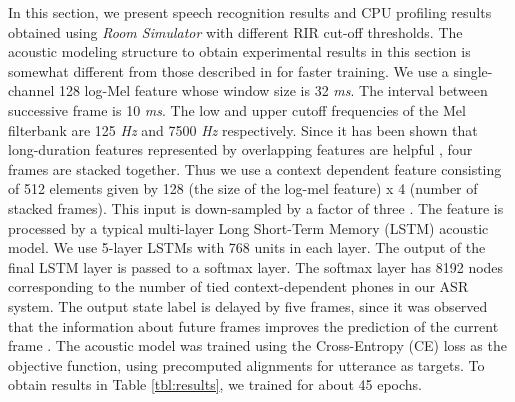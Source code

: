 \documentclass[a4paper]{article}
\begin{document}
In this section, we present speech recognition results and CPU profiling
results obtained using \textit{Room Simulator} with different RIR cut-off
thresholds. The acoustic modeling structure to obtain
 experimental results in this section is somewhat different
from those described in \cite{C_Kim_INTERSPEECH_2017_1, B_Li_INTERSPEECH_2017_1}
  for faster training.
We use a single-channel 128 log-Mel feature whose window
size is 32 \textit{ms}. The interval between successive frame is 10
\textit{ms}. The low and upper cutoff frequencies of the Mel filterbank
are 125 \textit{Hz} and 7500 \textit{Hz} respectively.
Since it has been shown that long-duration features represented by overlapping
features are helpful \cite{H_Sak_INTERSPEECH_2015_1}, four frames
are stacked together.
Thus we use a context dependent feature consisting of 512 elements
given by 128 (the size of the log-mel feature) x 4 (number of stacked frames).
  This input is down-sampled by a factor of three 
  \cite{g_pundak_interspeech_2016_00}.
  The feature is processed by a typical multi-layer Long Short-Term Memory 
  (LSTM) \cite{S_Hochreiter_neural_computation_1997_00, T_Sainath_ICASSP_2015_1} acoustic model.
We use 5-layer LSTMs with 768 units in each layer.
The output of the final LSTM layer is passed to a softmax layer.
The softmax layer has 8192 nodes corresponding to the number of tied
context-dependent phones in our ASR system. The output state label is delayed
by five frames, since it was observed that
the information about future frames improves the prediction of the current frame
  \cite{H_Sak_INTERSPEECH_2014_1, M_Schuster_ieee_trans_signal_processing_1997}.
%
The acoustic model was trained using the Cross-Entropy (CE) loss
as the objective function, using precomputed alignments for utterance as targets.
To obtain results in Table \ref{tbl:results}, we trained for about 45 epochs.
%
\end{document}
